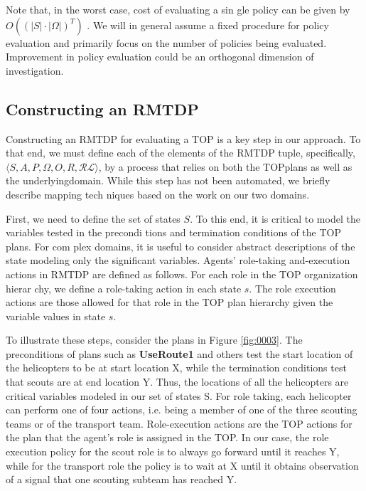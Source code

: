 \documentclass{IEEEtran}
\begin{document}
  Note that, in the worst case, cost of evaluating a sin
gle policy can be given by $O((|S|\cdot|\Omega|)^T)$ \cite{Pynadath}.  We will in general assume a fixed procedure
 for policy evaluation and primarily focus on the number of
 policies being evaluated. Improvement in policy evaluation
 could be an orthogonal dimension of investigation.

\subsection{\textbf{Constructing an RMTDP}}
Constructing an RMTDP for evaluating a TOP is a key
 step in our approach. To that end, we must define
 each of the elements of the RMTDP tuple, specifically, $\langle S,A,P,\Omega,O,R, \mathcal{RL} \rangle$,  by a process that relies on both the
 TOPplans as well as the underlyingdomain. While this step
 has not been automated, we briefly describe mapping tech
niques based on the work on our two domains.

 First, we need to define the set of states $S$. To this end,
 it is critical to model the variables tested in the precondi
tions and termination conditions of the TOP plans. For com
plex domains, it is useful to consider abstract descriptions
 of the state modeling only the significant variables. Agents'
 role-taking and-execution actions in RMTDP are defined
 as follows. For each role in the TOP organization hierar
chy, we define a role-taking action in each state $s$. The role
execution actions are those allowed for that role in the TOP
 plan hierarchy given the variable values in state $s$.

  To illustrate these steps, consider the plans in Figure \ref{fig:0003}.
 The preconditions of plans such as \textbf{UseRoute1} and others
 test the start location of the helicopters to be at start location
 X, while the termination conditions test that scouts are at
 end location Y. Thus, the locations of all the helicopters are
 critical variables modeled in our set of states S. For role
taking, each helicopter can perform one of four actions, i.e.
 being a member of one of the three scouting teams or of the
 transport team. Role-execution actions are the TOP actions
 for the plan that the agent's role is assigned in the TOP. In
 our case, the role execution policy for the scout role is to
 always go forward until it reaches Y, while for the transport
 role the policy is to wait at X until it obtains observation of
 a signal that one scouting subteam has reached Y.
\end{document}
